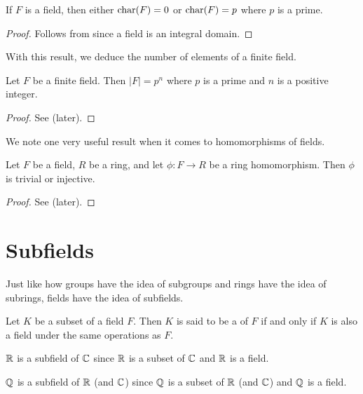 \begin{proposition}
    If $F$ is a field, then either $\mathrm{char}(F) = 0$ or $\mathrm{char}(F) = p$ where $p$ is a prime.
\end{proposition}
\begin{proof}
    Follows from  since a field is an integral domain.
\end{proof}

With this result, we deduce the number of elements of a finite field.
\begin{theorem}\label{thrm-finite-field-has-prime-power-order}
    Let $F$ be a finite field. Then $|F| = p^n$ where $p$ is a prime and $n$ is a positive integer.
\end{theorem}
\begin{proof}
    See  (later).
\end{proof}

We note one very useful result when it comes to homomorphisms of fields.
\begin{theorem}\label{thrm-homomorphism-from-field-is-injective-or-trivial}
    Let $F$ be a field, $R$ be a ring, and let $\phi: F \to R$ be a ring homomorphism. Then $\phi$ is trivial or injective.
\end{theorem}
\begin{proof}
    See  (later).
\end{proof}

\section{Subfields}
Just like how groups have the idea of subgroups and rings have the idea of subrings, fields have the idea of subfields.
\begin{definition}
    Let $K$ be a subset of a field $F$. Then $K$ is said to be a  of $F$ if and only if $K$ is also a field under the same operations as $F$.
\end{definition}

\begin{example}
    $\mathbb{R}$ is a subfield of $\mathbb{C}$ since $\mathbb{R}$ is a subset of $\mathbb{C}$ and $\mathbb{R}$ is a field.
\end{example}
\begin{example}
    $\mathbb{Q}$ is a subfield of $\mathbb{R}$ (and $\mathbb{C}$) since $\mathbb{Q}$ is a subset of $\mathbb{R}$ (and $\mathbb{C}$) and $\mathbb{Q}$ is a field.
\end{example}

